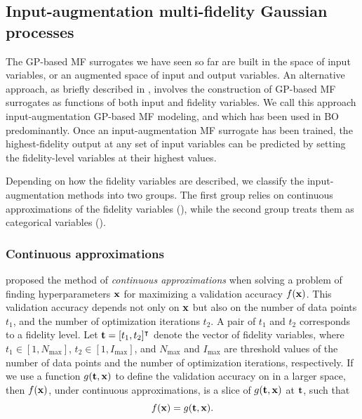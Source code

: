 \documentclass[iicol,sn-basic]{sn-jnl}%
\begin{document}
\subsection{Input-augmentation multi-fidelity Gaussian processes}\label{Sec46}

The GP-based MF surrogates we have seen so far are built in the space of input variables, or an augmented space of input and output variables.
An alternative approach, as briefly described in , involves the construction of GP-based MF surrogates as functions of both input and fidelity variables.
We call this approach input-augmentation GP-based MF modeling, and which has been used in BO predominantly.
Once an input-augmentation MF surrogate has been trained, the highest-fidelity output at any set of input variables can be predicted by setting the fidelity-level variables at their highest values.

Depending on how the fidelity variables are described, we classify the input-augmentation methods into two groups.
The first group relies on continuous approximations of the fidelity variables (), while the second group treats them as categorical variables ().

\subsubsection{Continuous approximations}\label{Sec461}

\cite{Kandasamy2017} proposed the method of \textit{continuous approximations} when solving a problem of finding hyperparameters ${\bf x}$ for maximizing a validation accuracy $f({\bf x})$.
This validation accuracy depends not only on ${\bf x}$ but also on the number of data points $t_1$, and the number of optimization iterations $t_2$.
A pair of $t_1$ and $t_2$ corresponds to a fidelity level.
Let ${\bf t}=[t_1,t_2]^\intercal$ denote the vector of fidelity variables, where $t_1 \in [1,N_{\max}]$, $t_2 \in [1,I_{\max}]$, and $N_{\max}$ and $I_{\max}$ are threshold values of the number of data points and the number of optimization iterations, respectively.
If we use a function $g({\bf t},{\bf x})$ to define the validation accuracy on in a larger space, then $f({\bf x})$, under continuous approximations, is a slice of $g({\bf t},{\bf x})$ at ${\bf t}$, such that
\begin{equation}\label{Eq33}
	f({\bf x}) = g({\bf t},{\bf x}).
\end{equation}
\end{document}
